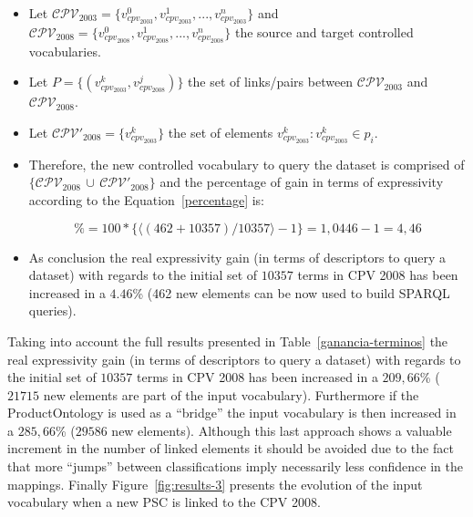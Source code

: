 \begin{itemize}
  \item Let $\mathcal{CPV}_{2003} = \{v^0_{cpv_{2003}}, v^1_{cpv_{2003}},...,v^n_{cpv_{2003}}\}$ and $\mathcal{CPV}_{2008} = \{v^0_{cpv_{2008}}, v^1_{cpv_{2008}},...,v^n_{cpv_{2008}}\}$ the source and target controlled vocabularies.
  \item Let $P = \{ (v^k_{cpv_{2003}},v^j_{cpv_{2008}})\}$ the set of links/pairs between $\mathcal{CPV}_{2003}$ and $\mathcal{CPV}_{2008}$.
  \item Let $\mathcal{CPV'}_{2008} = \{ v^k_{cpv_{2003}} \}$ the set of elements $v^k_{cpv_{2003}}: v^k_{cpv_{2003}} \in p_i$.
  \item Therefore, the new controlled vocabulary to query the dataset is comprised of $\{\mathcal{CPV}_{2008}\,\cup\,\mathcal{CPV'}_{2008}\}$ 
  and the percentage of gain in terms of expressivity according to the Equation~\ref{percentage} is:

  \begin{equation}
      \% = 100 * \{ \langle (462+10357) / 10357 \rangle -1 \} = 1,0446-1 = 4,46 
  \end{equation}
      
 \item As conclusion the real expressivity gain (in terms of descriptors to query a dataset) with regards to the initial set of $10357$ terms in CPV 2008 has been 
 increased in a $4.46$\% (462 new elements can be now used to build SPARQL queries). 

\end{itemize}

Taking into account the full results presented in Table~\ref{ganancia-terminos} the real expressivity gain (in terms of descriptors to query a dataset) 
with regards to the initial set of $10357$ terms in CPV 2008 has been increased in a $209,66$\% 
($21715$ new elements are part of the input vocabulary). Furthermore if the ProductOntology is used as a ``bridge'' the input vocabulary is then 
increased in a $285,66$\% ($29586$ new elements). Although this last approach shows a valuable increment in the number of linked elements 
it should be avoided due to the fact that more ``jumps'' between classifications imply necessarily less confidence in the mappings. Finally 
Figure~\ref{fig:results-3} presents the evolution of the input vocabulary when a new PSC is linked to the CPV 2008.

